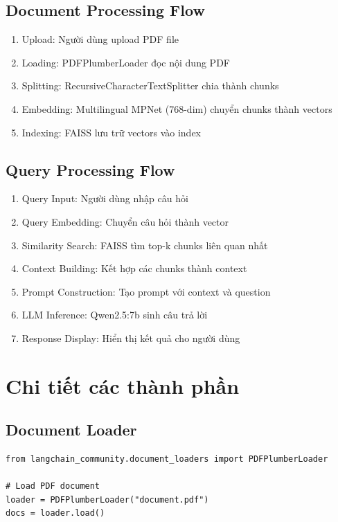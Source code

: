 \documentclass[12pt,a4paper]{report}
\begin{document}
\subsection{Document Processing Flow}
\begin{enumerate}
    \item Upload: Người dùng upload PDF file
    \item Loading: PDFPlumberLoader đọc nội dung PDF
    \item Splitting: RecursiveCharacterTextSplitter chia thành chunks
    \item Embedding: Multilingual MPNet (768-dim) chuyển chunks thành vectors
    \item Indexing: FAISS lưu trữ vectors vào index
\end{enumerate}

\subsection{Query Processing Flow}
\begin{enumerate}
    \item Query Input: Người dùng nhập câu hỏi
    \item Query Embedding: Chuyển câu hỏi thành vector
    \item Similarity Search: FAISS tìm top-k chunks liên quan nhất
    \item Context Building: Kết hợp các chunks thành context
    \item Prompt Construction: Tạo prompt với context và question
    \item LLM Inference: Qwen2.5:7b sinh câu trả lời
    \item Response Display: Hiển thị kết quả cho người dùng
\end{enumerate}

\section{Chi tiết các thành phần}

\subsection{Document Loader}
\begin{lstlisting}
from langchain_community.document_loaders import PDFPlumberLoader

# Load PDF document
loader = PDFPlumberLoader("document.pdf")
docs = loader.load()
\end{lstlisting}
\end{document}
